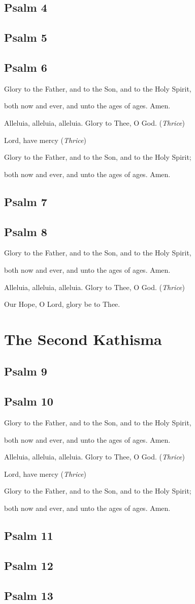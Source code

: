 \documentclass[12pt,openany]{book}
\newcommand{\kathismabreak}{
  \medskip
  \begin{center}
  \begin{footnotesize}
  Glory to the Father, and to the Son, and to the Holy Spirit,
  
  both now and ever, and unto the ages of ages. Amen.

  Alleluia, alleluia, alleluia. Glory to Thee, O God. (\textit{Thrice})

  Lord, have mercy (\textit{Thrice})

  Glory to the Father, and to the Son, and to the Holy Spirit;
  
  both now and ever, and unto the ages of ages. Amen.
  \end{footnotesize}
  \end{center}
  \smallbreak
}
\newcommand{\kathismaend}{
  \medskip
  \begin{center}
  \begin{footnotesize}
  Glory to the Father, and to the Son, and to the Holy Spirit,
  
  both now and ever, and unto the ages of ages. Amen.

  Alleluia, alleluia, alleluia. Glory to Thee, O God. (\textit{Thrice})

  Our Hope, O Lord, glory be to Thee.
  \end{footnotesize}
  \end{center}
  \smallbreak
}
\begin{document}
\section{Psalm 4}

\smallskip
\section{Psalm 5}

\smallskip
\section{Psalm 6}


\kathismabreak
\smallskip

\section{Psalm 7}

\smallskip
\section{Psalm 8}


\kathismaend

\chapter*{The Second Kathisma}
\smallskip
\section{Psalm 9}

\smallskip
\section{Psalm 10}


\kathismabreak
\smallskip
\pagebreak %

\section{Psalm 11}

\smallskip
\section{Psalm 12}

\smallskip
\section{Psalm 13}

\end{document}
